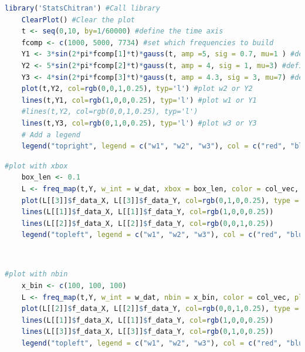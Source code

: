 \documentclass{article}
\begin{document}
\begin{lstlisting}[language=R, label={lst:cb9}, caption={code for signal building (noise removed and coloured in accordance to $\omega_i$). See fig.\ref{F3b} }, captionpos=b]
	library('StatsChitran') #Call library
	ClearPlot() #Clear the plot
	t <- seq(0,10, by=1/60000) #define the time axis
	fcomp <- c(1000, 5000, 7734) #set which frequencies to build
	Y1 <- 3*sin(2*pi*fcomp[1]*t)*gauss(t, amp =5, sig = 0.7, mu=1 ) #define signal w1 or Y1
	Y2 <- 5*sin(2*pi*fcomp[2]*t)*gauss(t, amp = 4, sig = 1, mu=3) #define signal w2 or Y2
	Y3 <- 4*sin(2*pi*fcomp[3]*t)*gauss(t, amp = 4.3, sig = 3, mu=7) #define signal w3 or Y3
	plot(t,Y2, col=rgb(0,0,1,0.25), typ='l') #plot w2 or Y2
	lines(t,Y1, col=rgb(1,0,0,0.25), typ='l') #plot w1 or Y1
	#lines(t,Y2, col=rgb(0,0,1,0.25), typ='l')
	lines(t,Y3, col=rgb(0,1,0,0.25), typ='l') #plot w3 or Y3
	# Add a legend
	legend("topright", legend = c("w1", "w2", "w3"), col = c("red", "blue", "green"), lty = 1, bg='transparent')
\end{lstlisting}
\pagebreak
\begin{lstlisting}[language=R, label={lst:cb10}, caption={code for frequency mapping using xbox (noise removed and coloured in accordance to $\omega_i$). See fig.\ref{F3a} }, captionpos=b]
	#plot with xbox
	box_len <- 0.1
	L <- freq_map(t,Y, w_int = w_dat, xbox = box_len, color = col_vec, plt = F)
	plot(L[[3]]$f_data_X, L[[3]]$f_data_Y, col=rgb(0,1,0,0.25), type = 'l', xlab = 'X', ylab = 'Y (arb. units)')
	lines(L[[1]]$f_data_X, L[[1]]$f_data_Y, col=rgb(1,0,0,0.25))
	lines(L[[2]]$f_data_X, L[[2]]$f_data_Y, col=rgb(0,0,1,0.25))
	legend("topleft", legend = c("w1", "w2", "w3"), col = c("red", "blue", "green"), lty = 1, bg='transparent')
\end{lstlisting}
 \\
\begin{lstlisting}[language=R, label={lst:cb11}, caption={code for frequency mapping using nbin (noise removed and coloured in accordance to $\omega_i$). See fig.\ref{F3c} }, captionpos=b]
	#plot with nbin
	x_bin <- c(100, 100, 100)
	L <- freq_map(t,Y, w_int = w_dat, nbin = x_bin, color = col_vec, plt = F)
	plot(L[[2]]$f_data_X, L[[2]]$f_data_Y, col=rgb(0,0,1,0.25), type = 'l', xlab = 'X', ylab = 'Y (arb. units)')
	lines(L[[1]]$f_data_X, L[[1]]$f_data_Y, col=rgb(1,0,0,0.25))
	lines(L[[3]]$f_data_X, L[[3]]$f_data_Y, col=rgb(0,1,0,0.25))
	legend("topleft", legend = c("w1", "w2", "w3"), col = c("red", "blue", "green"), lty = 1, bg='transparent')
\end{lstlisting}
\end{document}
